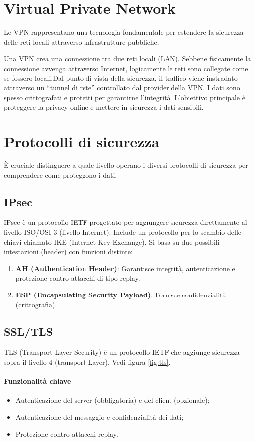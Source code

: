 %
%
\section{Virtual Private Network}
Le VPN rappresentano una tecnologia fondamentale per estendere la sicurezza delle reti locali attraverso infrastrutture pubbliche.

Una VPN crea una connessione tra due reti locali (LAN). Sebbene fisicamente la connessione avvenga attraverso Internet, logicamente le reti sono collegate come se fossero locali.Dal punto di vista della sicurezza, il traffico viene instradato attraverso un ``tunnel di rete''  controllato dal provider della VPN.
I dati sono spesso crittografati e protetti per garantirne l'integrità. L'obiettivo principale è proteggere la privacy online e mettere in sicurezza i dati sensibili.

%
\section{Protocolli di sicurezza}
È cruciale distinguere a quale livello operano i diversi protocolli di sicurezza per comprendere come proteggono i dati.
%
\subsection{IPsec}
IPsec è un protocollo IETF progettato per aggiungere sicurezza direttamente al livello ISO/OSI 3 (livello Internet). Include un protocollo per lo scambio delle chiavi chiamato IKE (Internet Key Exchange). Si basa su due possibili intestazioni (header) con funzioni distinte:
\begin{enumerate}
    \item \textbf{AH (Authentication Header)}: Garantisce integrità, autenticazione e protezione contro attacchi di tipo replay.
    \item \textbf{ESP (Encapsulating Security Payload)}: Fornisce confidenzialità (crittografia).
\end{enumerate}

%
\subsection{SSL/TLS}
TLS (Transport Layer Security) è un protocollo IETF che aggiunge sicurezza sopra il livello 4 (transport Layer).
Vedi figura \ref{fig:tls}.
%
\paragraph{Funzionalità chiave}
\begin{itemize}
    \item Autenticazione del server (obbligatoria) e del client (opzionale);
    \item Autenticazione del messaggio e confidenzialità dei dati;
    \item Protezione contro attacchi replay.
\end{itemize}
%
